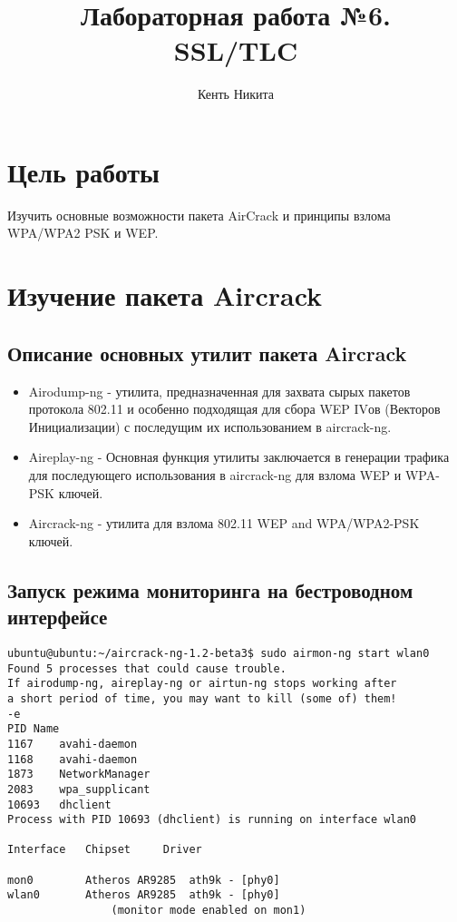 \documentclass[10pt,a4paper]{report}
\author{Кенть Никита}
\title{Лабораторная работа №6.\\
	SSL/TLC}
\begin{document}
	\maketitle
	\renewcommand{\thesection}{\arabic{section}}
	\tableofcontents
	\pagebreak
	
	\setcounter{totalnumber}{10}
	\setcounter{topnumber}{10}
	\setcounter{bottomnumber}{10}
	\renewcommand{\topfraction}{1}
	\renewcommand{\textfraction}{0}
	
	\section{Цель работы}
		Изучить основные возможности пакета AirCrack и принципы взлома WPA/WPA2 PSK и WEP.
	\section{Изучение пакета Aircrack}
		\subsection{Описание основных утилит пакета Aircrack}
			\begin{itemize}
				\item Airodump-ng - утилита, предназначенная для захвата сырых пакетов протокола 802.11
и особенно подходящая для сбора WEP IVов (Векторов Инициализации) с последущим их
использованием в aircrack-ng.
				\item Aireplay-ng - Основная функция утилиты заключается в генерации трафика для последующего использования в aircrack-ng для взлома WEP и WPA-PSK ключей. 
				\item Aircrack-ng - утилита для взлома 802.11 WEP and WPA/WPA2-PSK ключей. 
			\end{itemize}
		\subsection{Запуск режима мониторинга на бестроводном интерфейсе}
			\begin{lstlisting}
ubuntu@ubuntu:~/aircrack-ng-1.2-beta3$ sudo airmon-ng start wlan0
Found 5 processes that could cause trouble.
If airodump-ng, aireplay-ng or airtun-ng stops working after
a short period of time, you may want to kill (some of) them!
-e 
PID	Name
1167	avahi-daemon
1168	avahi-daemon
1873	NetworkManager
2083	wpa_supplicant
10693	dhclient
Process with PID 10693 (dhclient) is running on interface wlan0

Interface	Chipset		Driver

mon0		Atheros AR9285	ath9k - [phy0]
wlan0		Atheros AR9285	ath9k - [phy0]
				(monitor mode enabled on mon1)

			\end{lstlisting}
\end{document}
